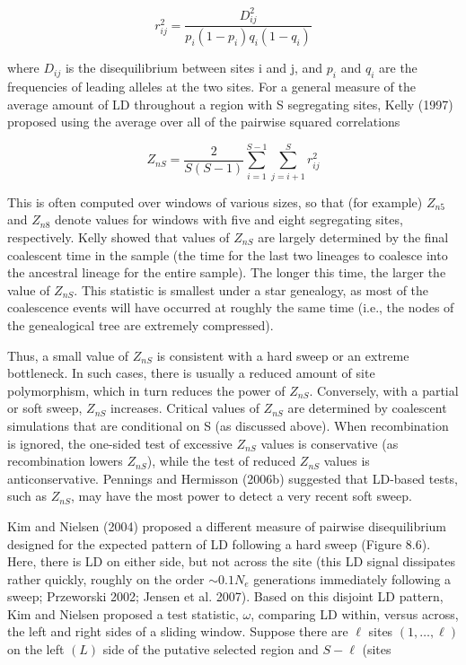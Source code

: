 \documentclass{article}
\begin{document}
\begin{equation}
r_{ij}^{2}=\frac{D_{ij}^{2}}{p_{i}(1-p_{i})q_{i}(1-q_{i})}
\tag{9.36a}
\label{eq:9_36a}
\end{equation}

where  $ D_{ij} $ is the disequilibrium between sites i and j, and  $ p_i $ and  $ q_i $ are the frequencies of leading alleles at the two sites. For a general measure of the average amount of LD throughout a region with S segregating sites, Kelly (1997) proposed using the average over all of the pairwise squared correlations

\begin{equation}
Z_{nS}=\frac{2}{S(S-1)}\sum_{i=1}^{S-1}\sum_{j=i+1}^{S}r_{ij}^{2}
\tag{9.36b}
\label{eq:9_36b}
\end{equation}

This is often computed over windows of various sizes, so that (for example)  $ Z_{n5} $ and  $ Z_{n8} $ denote values for windows with five and eight segregating sites, respectively. Kelly showed that values of  $ Z_{nS} $ are largely determined by the final coalescent time in the sample (the time for the last two lineages to coalesce into the ancestral lineage for the entire sample). The longer this time, the larger the value of  $ Z_{nS} $. This statistic is smallest under a star genealogy, as most of the coalescence events will have occurred at roughly the same time (i.e., the nodes of the genealogical tree are extremely compressed).

Thus, a small value of  $ Z_{nS} $ is consistent with a hard sweep or an extreme bottleneck. In such cases, there is usually a reduced amount of site polymorphism, which in turn reduces the power of  $ Z_{nS} $. Conversely, with a partial or soft sweep,  $ Z_{nS} $ increases. Critical values of  $ Z_{nS} $ are determined by coalescent simulations that are conditional on S (as discussed above). When recombination is ignored, the one-sided test of excessive  $ Z_{nS} $ values is conservative (as recombination lowers  $ Z_{nS} $), while the test of reduced  $ Z_{nS} $ values is anticonservative. Pennings and Hermisson (2006b) suggested that LD-based tests, such as  $ Z_{nS} $, may have the most power to detect a very recent soft sweep.

Kim and Nielsen (2004) proposed a different measure of pairwise disequilibrium designed for the expected pattern of LD following a hard sweep (Figure 8.6). Here, there is LD on either side, but not across the site (this LD signal dissipates rather quickly, roughly on the order  $ \sim 0.1N_e $ generations immediately following a sweep; Przeworski 2002; Jensen et al. 2007). Based on this disjoint LD pattern, Kim and Nielsen proposed a test statistic,  $ \omega $, comparing LD within, versus across, the left and right sides of a sliding window. Suppose there are  $ \ell $ sites  $ (1, \ldots, \ell) $ on the left  $ (L) $ side of the putative selected region and  $ S - \ell $ (sites
\end{document}
